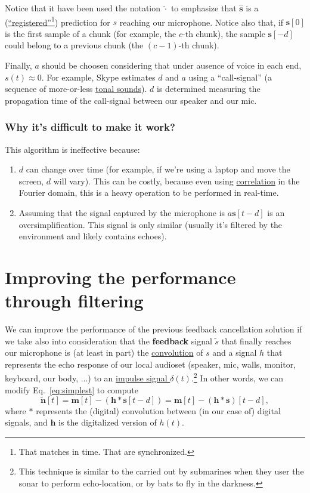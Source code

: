 Notice that it have been used the notation $\hat{\cdot}$ to emphasize
that $\hat{\mathbf s}$ is a
(\href{https://en.wikipedia.org/wiki/Image_registration}{``registered''}\footnote{That
matches in time. That are synchronized.}) prediction for $s$ reaching
our microphone. Notice also that, if ${\mathbf s}[0]$ is the first
sample of a chunk (for example, the $c$-th chunk), the sample
${\mathbf s}[-d]$ could belong to a previous chunk (the $(c-1)$-th
chunk).

Finally, $a$ should be choosen considering that under ausence of voice
in each end, $s(t)\approx 0$. For example, Skype estimates $d$ and $a$
using a ``call-signal'' (a sequence of more-or-less
\href{https://en.wikipedia.org/wiki/Musical_tone}{tonal sounds}). $d$
is determined measuring the propagation time of the call-signal
between our speaker and our mic.

\subsubsection*{Why it's difficult to make it work?}
This algorithm is ineffective because:
\begin{enumerate}
\item $d$ can change over time (for example, if we're using a laptop
  and move the screen, $d$ will vary). This can be costly, because
  even using \href{https://en.wikipedia.org/wiki/Correlation}{correlation}
  in the Fourier domain, this is a heavy operation to be performed in
  real-time.
\item Assuming that the signal captured by the microphone is
  $a{\mathbf s}[t-d]$ is an oversimplification. This signal is only
  similar (usually it's filtered by the environment and likely
  contains echoes).
\end{enumerate}

\section{Improving the performance through filtering}
We can improve the performance of the previous feedback cancellation
solution if we take also into consideration that the \textbf{feedback}
signal $\tilde{s}$ that finally reaches our microphone is (at least in
part) the
\href{https://en.wikipedia.org/wiki/Convolution}{convolution} of
$s$ and a signal $h$ that represents the echo response of our
local audioset (speaker, mic, walls, monitor, keyboard, our body, ...)
to an \href{https://en.wikipedia.org/wiki/Impulse_response}{impulse
  signal $\delta(t)$}.\footnote{This technique is similar to the
  carried out by submarines when they user the sonar to perform
  echo-location, or by bats to fly in the darkness.} In other words,
we can modify Eq.~\eqref{eq:simplest} to compute
\begin{equation}
 \tilde{\mathbf{n}}[t] = \mathbf{m}[t] - (\mathbf{h}\ast\mathbf{s}[t-d]) = \mathbf{m}[t] - (\mathbf{h}\ast\mathbf{s})[t-d],
  \label{eq:using_convolution}
\end{equation}
where $\ast$ represents the (digital) convolution between (in our case
of) digital signals, and ${\mathbf h}$ is the digitalized version of
$h(t)$.

